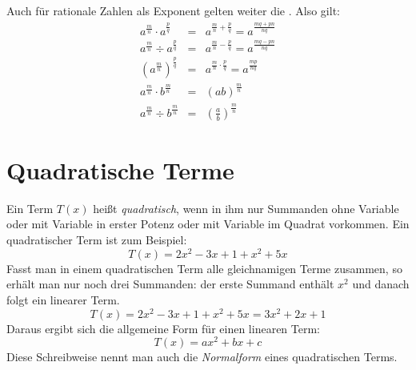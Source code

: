 \begin{beme}
 Auch für rationale Zahlen als Exponent gelten weiter die . Also gilt:
 \begin{eqnarray*}
  a^{\frac{m}{n}} \cdot a^{\frac{p}{q}} &=& a^{\frac{m}{n}+\frac{p}{q}} = a^{\frac{mq+pn}{nq}}\\
  a^{\frac{m}{n}} \div a^{\frac{p}{q}} &=& a^{\frac{m}{n}-\frac{p}{q}} = a^{\frac{mq-pn}{nq}}\\
  \left(a^{\frac{m}{n}}\right)^{\frac{p}{q}} &=& a^{\frac{m}{n}\cdot \frac{p}{q}} = a^{\frac{mp}{nq}} \\
  a^{\frac{m}{n}} \cdot b^{\frac{m}{n}} &=& (ab)^{\frac{m}{n}}\\
  a^{\frac{m}{n}} \div b^{\frac{m}{n}} &=& \left(\frac{a}{b}\right)^{\frac{m}{n}}
 \end{eqnarray*}

\end{beme}


\section{Quadratische Terme}
\label{sec:quadterm}

\begin{defi}
 Ein Term \(T(x)\) heißt \emph{quadratisch}, wenn in ihm nur Summanden ohne Variable oder mit Variable in erster Potenz  oder mit Variable im Quadrat vorkommen. Ein quadratischer Term ist zum Beispiel:
 \begin{equation*}
  T(x) = 2x^2-3x+1+x^2+5x
 \end{equation*}
Fasst man in einem quadratischen Term alle gleichnamigen Terme zusammen, so erhält man nur noch drei Summanden: der erste Summand enthält \(x^2\) und danach folgt ein linearer Term.
 \begin{equation*}
  T(x) = 2x^2-3x+1+x^2+5x = 3x^2 +2x+1
 \end{equation*}
 Daraus ergibt sich die allgemeine Form für einen linearen Term:
 \begin{equation*}
  T(x) = ax^2+bx+c
 \end{equation*}
 Diese Schreibweise nennt man auch die \emph{Normalform} eines quadratischen Terms.
\end{defi}

